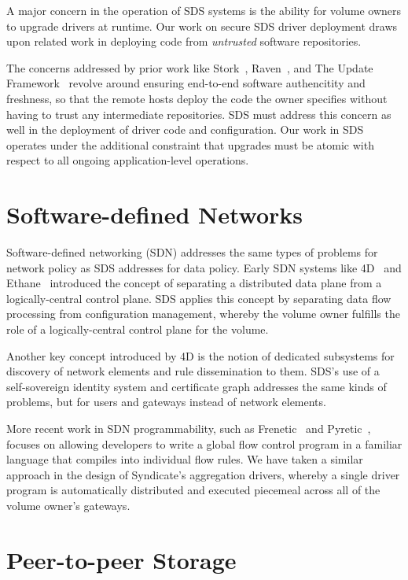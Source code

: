 A major concern in the operation of SDS systems is the ability for volume owners
to upgrade drivers at runtime.  Our work on secure SDS driver
deployment draws upon related work in deploying code from \emph{untrusted} software
repositories.

The concerns addressed by prior work like Stork~\cite{stork},
Raven~\cite{raven}, and The Update Framework~\cite{TUF}
revolve around ensuring end-to-end software authencitity and
freshness, so that the remote hosts deploy the code the owner specifies without
having to trust any intermediate repositories.
SDS must address this concern as
well in the deployment of driver code and configuration.  Our work in SDS
operates under the additional constraint that upgrades must be atomic with
respect to all ongoing application-level operations.

\section{Software-defined Networks}

Software-defined networking (SDN) addresses the same types of problems for
network policy as SDS addresses for data policy.  Early SDN systems like
4D~\cite{4D} and Ethane~\cite{ethane} introduced the concept of separating a
distributed data plane from a logically-central control plane.  SDS applies this concept by
separating data flow processing from configuration management, whereby the
volume owner fulfills the role of a logically-central control plane for the
volume.

Another key concept introduced by 4D is the notion of
dedicated subsystems for discovery of network elements and rule dissemination to
them.  SDS's use of a self-sovereign identity system and certificate graph
addresses the same kinds of problems, but for users and gateways instead of network
elements.

More recent work in SDN programmability, such as Frenetic~\cite{frenetic} and
Pyretic~\cite{pyretic}, focuses on allowing developers to write a global flow
control program in a familiar language that compiles into individual flow rules.
We have taken a similar approach in the design of Syndicate's aggregation
drivers, whereby a single driver program is automatically distributed and
executed piecemeal across all of the volume owner's gateways.

\section{Peer-to-peer Storage}


